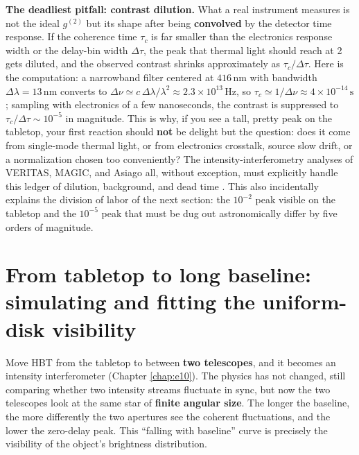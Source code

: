 \textbf{The deadliest pitfall: contrast dilution.} What a real instrument measures is not the ideal \(g^{(2)}\) but its shape after being \textbf{convolved} by the detector time response. If the coherence time \(\tau_c\) is far smaller than the electronics response width or the delay-bin width \(\Delta\tau\), the peak that thermal light should reach at 2 gets diluted, and the observed contrast shrinks approximately as \(\tau_c/\Delta\tau\). Here is the computation: a narrowband filter centered at \(416\,\mathrm{nm}\) with bandwidth \(\Delta\lambda=13\,\mathrm{nm}\) converts to \(\Delta\nu\simeq c\,\Delta\lambda/\lambda^2\approx2.3\times10^{13}\,\mathrm{Hz}\), so \(\tau_c\simeq1/\Delta\nu\approx4\times10^{-14}\,\mathrm{s}\); sampling with electronics of a few nanoseconds, the contrast is suppressed to \(\tau_c/\Delta\tau\sim10^{-5}\) in magnitude. This is why, if you see a tall, pretty peak on the tabletop, your first reaction should \textbf{not} be delight but the question: does it come from single-mode thermal light, or from electronics crosstalk, source slow drift, or a normalization chosen too conveniently? The intensity-interferometry analyses of VERITAS, MAGIC, and Asiago all, without exception, must explicitly handle this ledger of dilution, background, and dead time \citep{2009A&A...508..531N,2020NatAs...4.1164A,2024MNRAS.529.4387A,2017MNRAS.472.4126G}. This also incidentally explains the division of labor of the next section: the \(10^{-2}\) peak visible on the tabletop and the \(10^{-5}\) peak that must be dug out astronomically differ by five orders of magnitude.

\section{From tabletop to long baseline: simulating and fitting the uniform-disk visibility}
\label{sec:e26-disk}

Move HBT from the tabletop to between \textbf{two telescopes}, and it becomes an intensity interferometer (Chapter \ref{chap:e10}). The physics has not changed, still comparing whether two intensity streams fluctuate in sync, but now the two telescopes look at the same star of \textbf{finite angular size}. The longer the baseline, the more differently the two apertures see the coherent fluctuations, and the lower the zero-delay peak. This ``falling with baseline'' curve is precisely the visibility of the object's brightness distribution.

